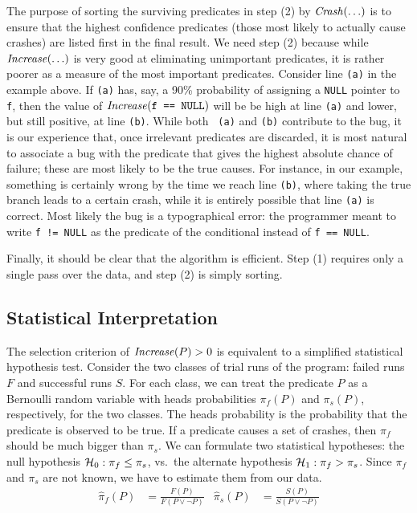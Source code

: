 The purpose of sorting the surviving predicates in step (2) by
$\mbox{\textit{Crash}}(\ldots)$ is to ensure that the highest confidence predicates (those
most likely to actually cause crashes) are listed first in the final
result.  We need step (2) because while $\mbox{\textit{Increase}}(\ldots)$ is very good at
eliminating unimportant predicates, it is rather poorer as a measure
of the most important predicates.  Consider line {\tt (a)} in the
example above.  If {\tt (a)} has, say, a 90\% probability of assigning
a {\tt NULL} pointer to {\tt f}, then the value of
$\mbox{\textit{Increase}}(\mbox{\tt f == NULL})$ will be be high at line {\tt (a)}
and lower, but still positive, at line {\tt (b)}.  While both {\tt
(a)} and {\tt (b)} contribute to the bug, it is our experience that,
once irrelevant predicates are discarded, it is most natural to
associate a bug with the predicate that gives the highest absolute
chance of failure; these are most likely to be the true causes.  For
instance, in our example, something is certainly wrong by the time we
reach line {\tt (b)}, where taking the true branch leads to a certain
crash, while it is entirely possible that line {\tt (a)} is correct.
Most likely the bug is a typographical error: the programmer meant to
write {\tt f != NULL} as the predicate of the conditional instead of
{\tt f == NULL}.

Finally, it should be clear that the algorithm is efficient.
Step (1) requires only a single pass over the data, and step (2) is
simply sorting.

\subsection{Statistical Interpretation}

The selection criterion of $\mbox{\textit{Increase}}(P) > 0$ is equivalent to a simplified
statistical hypothesis test.  Consider the two classes of trial runs
of the program: failed runs $F$ and successful runs $S$.  For each
class, we can treat the predicate $P$ as a Bernoulli random variable
with heads probabilities $\pi_f(P)$ and $\pi_s(P)$, respectively, for the
two classes.  The heads
probability is the probability that the predicate is observed to be
true.  If a predicate causes a set of crashes, then $\pi_f$ should be
much bigger than $\pi_s$.  We can formulate two statistical hypotheses:
the null hypothesis ${\mathcal{H}}_0:
\pi_f \leq \pi_s$, vs.\ the alternate hypothesis ${\mathcal{H}}_1: \pi_f > \pi_s$.  Since
$\pi_f$ and $\pi_s$ are not known, we have to estimate them from our
data.
\begin{align*}
  \hat \pi_f(P) &= \frac{F(P)}{F(P \lor \lnot P)} &
  \hat \pi_s(P) &= \frac{S(P)}{S(P \lor \lnot P)}
\end{align*}

